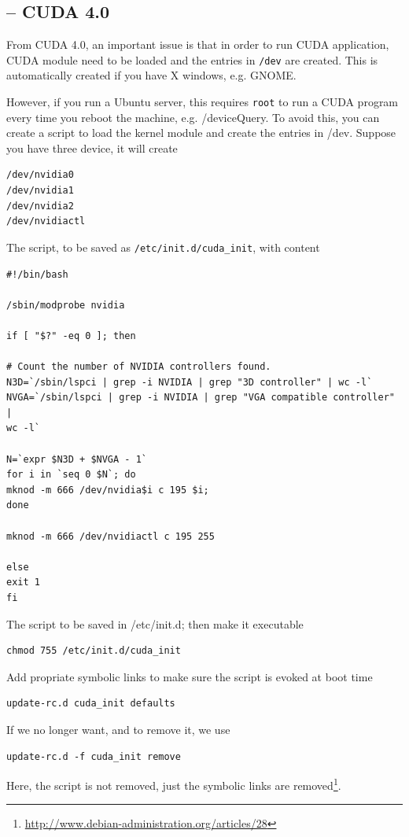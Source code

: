 \subsection{-- CUDA 4.0}

From CUDA 4.0, an important issue is that in order to run CUDA
application, CUDA module need to be loaded and the entries in \verb!/dev! are
created. This is automatically  created if you have X windows, e.g. GNOME.

However, if you run a Ubuntu server,  this requires \verb!root! to run a CUDA
program every time you reboot the  machine, e.g. /deviceQuery. To avoid this,
you can create a script to load the kernel module and create the entries in
/dev. Suppose you have three device, it will create
\begin{verbatim}
/dev/nvidia0
/dev/nvidia1
/dev/nvidia2
/dev/nvidiactl
\end{verbatim}

The script, to be saved as \verb!/etc/init.d/cuda_init!, with content
\begin{verbatim}
#!/bin/bash

/sbin/modprobe nvidia

if [ "$?" -eq 0 ]; then

# Count the number of NVIDIA controllers found.
N3D=`/sbin/lspci | grep -i NVIDIA | grep "3D controller" | wc -l`
NVGA=`/sbin/lspci | grep -i NVIDIA | grep "VGA compatible controller" |
wc -l`

N=`expr $N3D + $NVGA - 1`
for i in `seq 0 $N`; do
mknod -m 666 /dev/nvidia$i c 195 $i;
done

mknod -m 666 /dev/nvidiactl c 195 255

else
exit 1
fi
\end{verbatim}

The script to be saved in /etc/init.d; then make it executable
\begin{verbatim}
chmod 755 /etc/init.d/cuda_init
\end{verbatim}
Add propriate symbolic links to make sure the script is evoked at boot time
\begin{verbatim}
update-rc.d cuda_init defaults
\end{verbatim}
If we no longer want, and to remove it, we use
\begin{verbatim}
update-rc.d -f cuda_init remove
\end{verbatim}
Here, the script is not removed, just the symbolic links are
removed\footnote{\url{http://www.debian-administration.org/articles/28}}.


